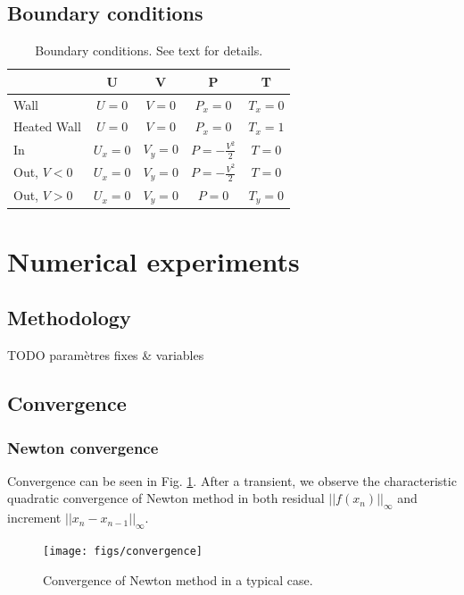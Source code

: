 \documentclass[12pt]{article}
\begin{document}
\subsection{Boundary conditions}
\begin{table}[!h]
  \centering
  \begin{tabular}{|l|c|c|c|c|}
    \hline
    & U & V & P & T \\
    \hline
    Wall         & $U = 0$     & $V = 0$     & $P_{x} = 0$             & $T_{x} = 0$ \\
    Heated Wall  & $U = 0$     & $V = 0$     & $P_{x} = 0$             & $T_{x} = 1$ \\
    \hline
    In           & $U_{x} = 0$ & $V_{y} = 0$ & $P = -\frac{V^{2}}{2}$  & $T = 0$     \\
    Out, $V < 0$ & $U_{x} = 0$ & $V_{y} = 0$ & $P = -\frac{V^{2}}{2} $ & $T = 0$     \\
    Out, $V > 0$ & $U_{x} = 0$ & $V_{y} = 0$ & $P = 0$                 & $T_y = 0$   \\
    \hline
  \end{tabular}
  \caption{Boundary conditions. See text for details.}
\end{table}

\section{Numerical experiments}
\subsection{Methodology}
TODO param\`etres fixes \& variables
\subsection{Convergence}
\subsubsection{Newton convergence}
\label{sec:conv_newton}
Convergence can be seen in Fig. \ref{fig:conv_newton}. After a
transient, we observe the characteristic quadratic convergence of
Newton method in both residual $||f(x_n)||_\infty$ and increment $||x_{n} -
x_{n-1}||_\infty$.
\begin{figure}[htb]
\centering
\texttt{[image: figs/convergence]}
\caption{Convergence of Newton method in a typical case.}
\label{fig:conv_newton}
\end{figure}
\end{document}

